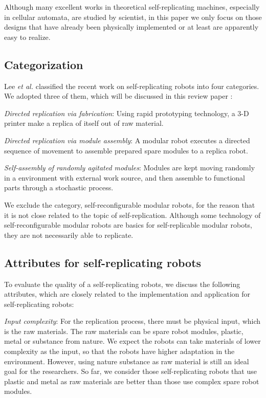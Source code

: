 \documentclass[12pt,twoside]{article}
\theoremstyle{plain}
\theoremstyle{definition}
\theoremstyle{remark}
\newcommand{\etal}{\textit{et al.}}
\begin{document}
Although many excellent works in theoretical self-replicating machines, especially in cellular automata, are studied by scientist, in this paper we only focus on those designs that have already been physically implemented or at least are apparently easy to realize.

\subsection{Categorization}
Lee \etal\cite{lee_robotic_2008} classified the recent work on self-replicating robots into four categories. We adopted three of them, which will be discussed in this review paper :

  \emph{Directed replication via fabrication}: Using rapid prototyping technology, a 3-D printer make a replica of itself out of raw material.
  
  \emph{Directed replication via module assembly}: A modular robot executes a directed sequence of movement to assemble prepared spare modules to a replica robot.
  
  \emph{Self-assembly of randomly agitated modules}: Modules are kept moving randomly in a environment with external work source, and then assemble to functional parts through a stochastic process.

We exclude the category, self-reconfigurable modular robots, for the reason that it is not close related to the topic of self-replication. Although some technology of self-reconfigurable modular robots are basics for self-replicable modular robots, they are not necessarily able to replicate.

\subsection{Attributes for self-replicating robots}
\label{sec:attri}
To evaluate the quality of a self-replicating robots, we discuss the following attributes, which are closely related to the implementation and application for self-replicating robots:

\emph{Input complexity}: For the replication process, there must be physical input, which is the raw materials. The raw materials can be spare robot modules, plastic, metal or substance from nature. We expect the robots can take materials of lower complexity as the input, so that the robots have higher adaptation in the environment. However, using nature substance as raw material is still an ideal goal for the researchers. So far, we consider those self-replicating robots that use plastic and metal as raw materials are better than those use complex spare robot modules.
  
\end{document}
